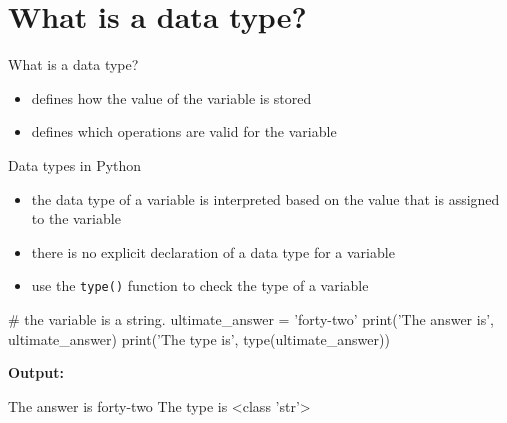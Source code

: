 \documentclass[
  american,
  ignorenonframetext,
]{beamer}
\newenvironment{pyexec}[1]{\noindent \textbf{Output: }  #1}{}
\begin{document}
\hypertarget{what-is-a-data-type}{%
\section{What is a data type?}\label{what-is-a-data-type}}

\begin{frame}{What is a data type?}
\protect\hypertarget{what-is-a-data-type-1}{}

\begin{itemize}
\item
  defines how the value of the variable is stored
\item
  defines which operations are valid for the variable
\end{itemize}


\end{frame}

\begin{frame}{Data types in Python}
\protect\hypertarget{data-types-in-python}{}

\begin{itemize}
\item
  the data type of a variable is interpreted based on the value that is
  assigned to the variable
\item
  there is no explicit declaration of a data type for a variable
\item
  use the \texttt{type()} function to check the type of a variable
  \vspace{2em}
\end{itemize}


\end{frame}

\begin{frame}{}
\protect\hypertarget{section-1}{}

\begin{pythoncode}

# the variable is a string.
ultimate_answer = 'forty-two'
print('The answer is', ultimate_answer)
print('The type is', type(ultimate_answer))

\end{pythoncode}

\begin{pyexec}

\begin{outputcode}

The answer is forty-two
The type is <class 'str'>

\end{outputcode}

\end{pyexec}

\end{frame}
\end{document}
